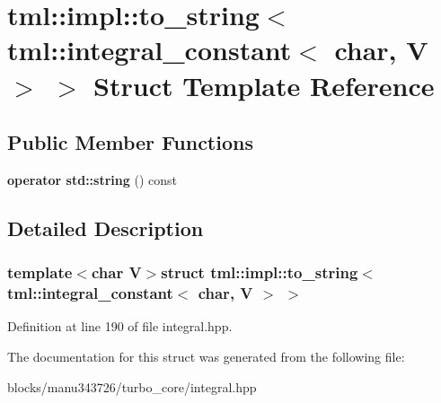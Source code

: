\hypertarget{structtml_1_1impl_1_1to__string_3_01tml_1_1integral__constant_3_01char_00_01_v_01_4_01_4}{\section{tml\+:\+:impl\+:\+:to\+\_\+string$<$ tml\+:\+:integral\+\_\+constant$<$ char, V $>$ $>$ Struct Template Reference}
\label{structtml_1_1impl_1_1to__string_3_01tml_1_1integral__constant_3_01char_00_01_v_01_4_01_4}
}
\subsection*{Public Member Functions}
\begin{DoxyCompactItemize}
\item 
\hypertarget{structtml_1_1impl_1_1to__string_3_01tml_1_1integral__constant_3_01char_00_01_v_01_4_01_4_ae0d7549c25856c74afd201b09f4899b1}{{\bfseries operator std\+::string} () const }\label{structtml_1_1impl_1_1to__string_3_01tml_1_1integral__constant_3_01char_00_01_v_01_4_01_4_ae0d7549c25856c74afd201b09f4899b1}

\end{DoxyCompactItemize}


\subsection{Detailed Description}
\subsubsection*{template$<$char V$>$struct tml\+::impl\+::to\+\_\+string$<$ tml\+::integral\+\_\+constant$<$ char, V $>$ $>$}



Definition at line 190 of file integral.\+hpp.



The documentation for this struct was generated from the following file\+:\begin{DoxyCompactItemize}
\item 
blocks/manu343726/turbo\+\_\+core/integral.\+hpp\end{DoxyCompactItemize}
